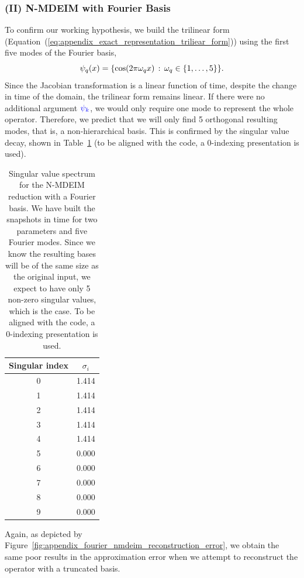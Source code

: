 \documentclass[../../thesis.tex]{subfiles}
\begin{document}
\subsubsection{(II) N-MDEIM with Fourier Basis}
To confirm our working hypothesis, 
we build the trilinear form 
(Equation~(\ref{eq:appendix_exact_representation_triliear_form}))
using the first five modes of the Fourier basis,
\begin{equation}
    \psi_q(x) = \qty{\cos(2 \pi \omega_q x) \, : \, \omega_q \in \qty{1, \ldots, 5}}.
\end{equation}
Since the Jacobian transformation is a linear function of time, 
despite the change in time of the domain, the trilinear form remains linear.
If there were no additional argument 
$\textcolor{blue}{\psi_k}$, 
we would only require one mode to represent the whole operator.
Therefore, we predict that we will only find 5 orthogonal resulting modes, that is, a non-hierarchical basis. 
This is confirmed by the singular value decay, 
shown in Table~\ref{tab:ndeim_with_fourier_modes}
(to be aligned with the code, a 0-indexing presentation is used).

\begin{table}[h]
    \centering
    \caption{Singular value spectrum for the N-MDEIM reduction with a Fourier basis.
    We have built the snapshots in time for two parameters and five Fourier modes.
    Since we know the resulting bases will be of the same size as the original input,
    we expect to have only 5 non-zero singular values, which is the case.
    To be aligned with the code, a 0-indexing presentation is used.}
    \begin{tabular}{cc}
        \toprule
        Singular index & $\sigma_i$ \\
        \midrule
        0 &  1.414 \\
        1 &  1.414 \\
        2 &  1.414 \\
        3 &  1.414 \\
        4 &  1.414 \\
        5 &  0.000 \\
        6 &  0.000 \\
        7 &  0.000 \\
        8 &  0.000 \\
        9 &  0.000 \\
        \bottomrule
    \end{tabular}
    \label{tab:ndeim_with_fourier_modes}
\end{table}
Again, as depicted by Figure~\ref{fig:appendix_fourier_nmdeim_reconstruction_error},
we obtain the same poor results in the approximation error when
we attempt to reconstruct the operator with a truncated basis. 
\end{document}
